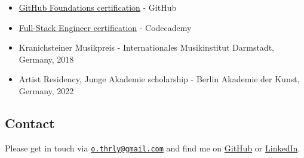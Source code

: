 \documentclass[10pt,a4paper]{article}
\providecommand{\tightlist}{%
  \setlength{\itemsep}{0pt}\setlength{\parskip}{0pt}}
\begin{document}
\begin{itemize}
\tightlist
\item
  \href{https://www.credly.com/badges/8f2ca183-49d2-426a-8483-cbdb8f4efdbd/public_url}{GitHub
  Foundations certification} - GitHub
\item
  \href{https://www.codecademy.com/profiles/thrly/certificates/ffd0f42cce1a44e9a0108b365047a0a6}{Full-Stack
  Engineer certification} - Codecademy
\item
  Kranichsteiner Musikpreis - Internationales Musikinstitut Darmstadt,
  Germany, 2018
\item
  Artist Residency, Junge Akademie scholarship - Berlin Akademie der
  Kunst, Germany, 2022
\end{itemize}

\subsection{Contact}\label{contact}

Please get in touch via
\href{mailto:o.thrly@gmail.com}{\nolinkurl{o.thrly@gmail.com}} and find
me on \href{https://github.com/thrly}{GitHub} or
\href{https://www.linkedin.com/in/oliver-thurley}{LinkedIn}.
\end{document}

